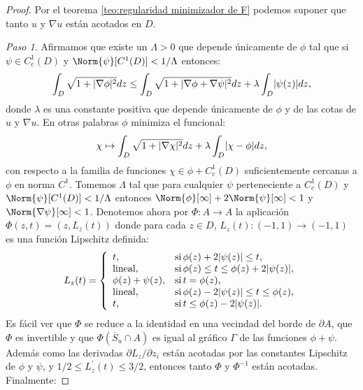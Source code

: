 \documentclass[a4paper,11pt,spanish, twoside, leqno]{tfm-uam}
\begin{document}
\begin{proof}
Por el teorema \ref{teo:regularidad minimizador de F} podemos suponer que tanto $u$ y $\nabla{u}$ están acotados en $D$.

\textit{Paso 1}. Afirmamos que existe un $\Lambda>0$ que depende únicamente de $\phi$ tal que si $\psi\in C^{1}_{c}(D)$ y $\Norm{\psi}[C^{1}(D)]<1/\Lambda$ entonces:
\begin{align}\label{proof:ecuacion de curvatura media para phi, g acotada:eq:1}
\int_{D}\sqrt{1+\lvert\nabla{\phi}\rvert^{2}}dz\leq \int_{D}\sqrt{1+\lvert\nabla{\phi}+\nabla{\psi}\rvert^{2}}dz+\lambda\int_{D}\lvert\psi(z)\rvert dz,
\end{align}
donde $\lambda$ es una constante positiva que depende únicamente de $\phi$ y de las cotas de $u$ y $\nabla{u}$. En otras palabras $\phi$ minimiza el funcional:
\begin{align}\label{proof:ecuacion de curvatura media para phi, g acotada:eq:2}
\chi\mapsto \int_{D}\sqrt{1+\lvert\nabla{\chi}\rvert^{2}}dz+\lambda \int_{D}\lvert\chi-\phi\rvert dz,
\end{align}  
con respecto a la familia de funciones $\chi\in \phi+C^{1}_{c}(D)$ suficientemente cercanas a $\phi$ en norma $C^{1}$. Tomemos $\Lambda$ tal que para cualquier $\psi$ perteneciente a $C^{1}_{c}(D)$ y $\Norm{\psi}[C^{1}(D)]<1/\Lambda$ entonces $\Norm{\phi}[\infty]+2\Norm{\psi}[\infty]<1$ y $\Norm{\nabla{\psi}}[\infty]<1$. Denotemos ahora por $\Phi:A\to A$ la aplicación $\Phi(z,t)=(z,L_{z}(t))$ donde para cada $z\in D$, $L_{z}(t):(-1,1)\to (-1,1)$ es una función Lipschitz definida:
\begin{align*}
L_{z}(t)=\left \{ \begin{array}{ll}
t,& \text{si}\,  \phi(z)+2\lvert\psi(z)\rvert\leq t,\\
\text{lineal}, & \text{si}\, \phi(z)\leq t \leq \phi(z)+2\lvert\psi(z)\rvert,\\
\phi(z)+\psi(z), &\text{si}\, t=\phi(z),\\
\text{lineal}, & \text{si}\, \phi(z)-2\lvert\psi(z)\rvert\leq t\leq \phi(z),\\
t, & \text{si}\, t\leq \phi(z)-2\lvert\psi(z)\rvert.\\
\end{array} \right .
\end{align*}
Es fácil ver que $\Phi$ se reduce a la identidad en una vecindad del borde de $\partial A$, que $\Phi$ es invertible y que $\Phi(\overline{S}_{u}\cap A)$ es igual al gráfico $\Gamma$ de las funciones $\phi+\psi$. Además como las derivadas $\partial L_{z}/\partial z_{i}$ están acotadas por las constantes Lipschitz de $\phi$ y $\psi$, y $1/2\leq L^{'}_{z}(t)\leq 3/2$, entonces tanto $\Phi$ y $\Phi^{-1}$ están acotadas. Finalmente:

\end{proof}
\end{document}
